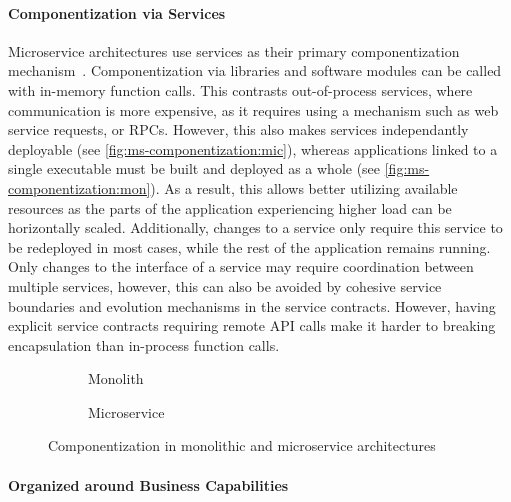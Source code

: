 \paragraph{Componentization via Services}

Microservice architectures use services as their primary componentization mechanism~\cite{Lewis2014}.
Componentization via libraries and software modules can be called with in-memory function calls.
This contrasts out-of-process services, where communication is more expensive, as it requires using a mechanism such as web service requests, or \acp{RPC}.
However, this also makes services independantly deployable (see \autoref{fig:ms-componentization:mic}), whereas applications linked to a single executable must be built and deployed as a whole (see \autoref{fig:ms-componentization:mon}).
As a result, this allows better utilizing available resources as the parts of the application experiencing higher load can be horizontally scaled.
Additionally, changes to a service only require this service to be redeployed in most cases, while the rest of the application remains running.
Only changes to the interface of a service may require coordination between multiple services, however, this can also be avoided by cohesive service boundaries and evolution mechanisms in the service contracts.
However, having explicit service contracts requiring remote \ac{API} calls make it harder to breaking encapsulation than in-process function calls.

\begin{figure}[!htb]
    \centering
    \begin{subfigure}{.5\textwidth}
        \centering
        
        \caption{Monolith}
        \label{fig:ms-componentization:mon}
    \end{subfigure}%
    \begin{subfigure}{.5\textwidth}
        \centering
        
        \caption{Microservice}
        \label{fig:ms-componentization:mic}
    \end{subfigure}
    \caption{Componentization in monolithic and microservice architectures~\cite{Lewis2014}}
    \label{fig:ms-componentization}
\end{figure}

\paragraph{Organized around Business Capabilities}

